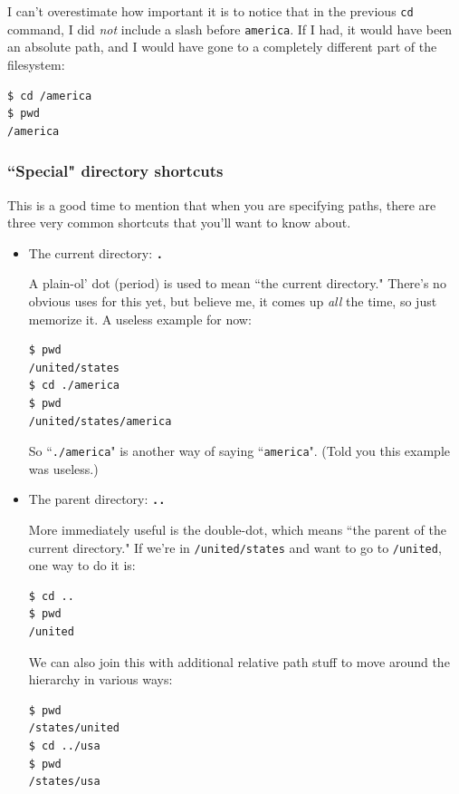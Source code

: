 \begin{enumerate}
I can't overestimate how important it is to notice that in the previous
\texttt{cd} command, I did \textit{not} include a slash before
\texttt{america}. If I had, it would have been an absolute path, and I would
have gone to a completely different part of the filesystem:

\begin{verbatim}
$ cd /america
$ pwd
/america
\end{verbatim}

\subsubsection{``Special" directory shortcuts}

This is a good time to mention that when you are specifying paths, there are
three very common shortcuts that you'll want to know about.


\begin{itemize}
\itemsep1em
\item The current directory: \texttt{\textbf{.}}

A plain-ol' dot (period) is used to mean ``the current directory." There's no
obvious uses for this yet, but believe me, it comes up \textit{all} the time,
so just memorize it. A useless example for now:

\begin{verbatim}
$ pwd
/united/states
$ cd ./america
$ pwd
/united/states/america
\end{verbatim}

So ``\texttt{./america}" is another way of saying ``\texttt{america}". (Told
you this example was useless.)

\item The parent directory: \texttt{\textbf{..}}

More immediately useful is the double-dot, which means ``the parent of the
current directory." If we're in \texttt{/united/states} and want to go to
\texttt{/united}, one way to do it is:

\begin{verbatim}
$ cd ..
$ pwd
/united
\end{verbatim}

We can also join this with additional relative path stuff to move around the
hierarchy in various ways:

\begin{verbatim}
$ pwd
/states/united
$ cd ../usa
$ pwd
/states/usa
\end{verbatim}


\end{itemize}
\end{enumerate}
